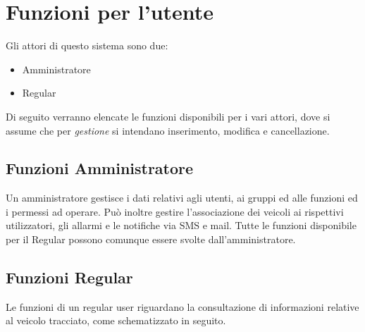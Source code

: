 \documentclass[a4paper,12pt]{article}
\begin{document}
\pagebreak

\section{Funzioni per l'utente}
Gli attori di questo sistema sono due:
\begin{itemize}
\item Amministratore
\item Regular
\end{itemize}

Di seguito verranno elencate le funzioni disponibili per i vari attori, dove si assume che per \textit{gestione} si intendano inserimento, modifica e cancellazione.

\subsection{Funzioni Amministratore}
Un amministratore gestisce i dati relativi agli utenti, ai gruppi ed alle funzioni ed i permessi ad operare. Può inoltre gestire l'associazione dei veicoli ai rispettivi utilizzatori, gli allarmi e le notifiche via SMS e mail. Tutte le funzioni disponibile per il Regular possono comunque essere svolte dall'amministratore.
\begin{center}
\end{center}

\pagebreak

\subsection{Funzioni Regular}
Le funzioni di un regular user riguardano la consultazione di informazioni relative al veicolo tracciato, come schematizzato in seguito.
\begin{center}
\end{center}
\end{document}
